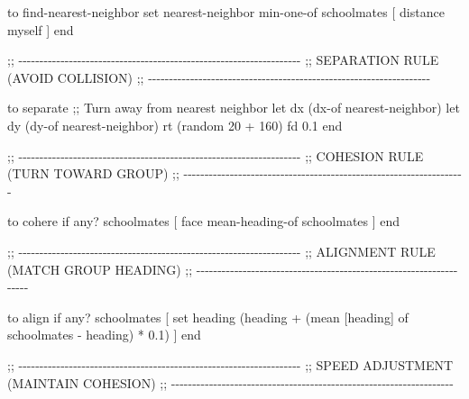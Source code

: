 \documentclass[
]{book}
\newenvironment{Shaded}{\begin{snugshade}}{\end{snugshade}}
\newcommand{\NormalTok}[1]{#1}
\begin{document}
\begin{Shaded}
\begin{Highlighting}[]
\NormalTok{to find{-}nearest{-}neighbor}
\NormalTok{  set nearest{-}neighbor min{-}one{-}of schoolmates [ distance myself ]}
\NormalTok{end}


\NormalTok{;; {-}{-}{-}{-}{-}{-}{-}{-}{-}{-}{-}{-}{-}{-}{-}{-}{-}{-}{-}{-}{-}{-}{-}{-}{-}{-}{-}{-}{-}{-}{-}{-}{-}{-}{-}{-}{-}{-}{-}{-}{-}{-}{-}{-}{-}{-}{-}{-}{-}{-}{-}{-}{-}{-}{-}{-}{-}{-}{-}{-}{-}{-}{-}{-}{-}{-}{-}}
\NormalTok{;;  SEPARATION RULE (AVOID COLLISION)}
\NormalTok{;; {-}{-}{-}{-}{-}{-}{-}{-}{-}{-}{-}{-}{-}{-}{-}{-}{-}{-}{-}{-}{-}{-}{-}{-}{-}{-}{-}{-}{-}{-}{-}{-}{-}{-}{-}{-}{-}{-}{-}{-}{-}{-}{-}{-}{-}{-}{-}{-}{-}{-}{-}{-}{-}{-}{-}{-}{-}{-}{-}{-}{-}{-}{-}{-}{-}{-}{-}}

\NormalTok{to separate}
\NormalTok{  ;; Turn away from nearest neighbor}
\NormalTok{  let dx (dx{-}of nearest{-}neighbor)}
\NormalTok{  let dy (dy{-}of nearest{-}neighbor)}
\NormalTok{  rt (random 20 + 160)}
\NormalTok{  fd 0.1}
\NormalTok{end}


\NormalTok{;; {-}{-}{-}{-}{-}{-}{-}{-}{-}{-}{-}{-}{-}{-}{-}{-}{-}{-}{-}{-}{-}{-}{-}{-}{-}{-}{-}{-}{-}{-}{-}{-}{-}{-}{-}{-}{-}{-}{-}{-}{-}{-}{-}{-}{-}{-}{-}{-}{-}{-}{-}{-}{-}{-}{-}{-}{-}{-}{-}{-}{-}{-}{-}{-}{-}{-}{-}}
\NormalTok{;;  COHESION RULE (TURN TOWARD GROUP)}
\NormalTok{;; {-}{-}{-}{-}{-}{-}{-}{-}{-}{-}{-}{-}{-}{-}{-}{-}{-}{-}{-}{-}{-}{-}{-}{-}{-}{-}{-}{-}{-}{-}{-}{-}{-}{-}{-}{-}{-}{-}{-}{-}{-}{-}{-}{-}{-}{-}{-}{-}{-}{-}{-}{-}{-}{-}{-}{-}{-}{-}{-}{-}{-}{-}{-}{-}{-}{-}{-}}

\NormalTok{to cohere}
\NormalTok{  if any? schoolmates [}
\NormalTok{    face mean{-}heading{-}of schoolmates}
\NormalTok{  ]}
\NormalTok{end}


\NormalTok{;; {-}{-}{-}{-}{-}{-}{-}{-}{-}{-}{-}{-}{-}{-}{-}{-}{-}{-}{-}{-}{-}{-}{-}{-}{-}{-}{-}{-}{-}{-}{-}{-}{-}{-}{-}{-}{-}{-}{-}{-}{-}{-}{-}{-}{-}{-}{-}{-}{-}{-}{-}{-}{-}{-}{-}{-}{-}{-}{-}{-}{-}{-}{-}{-}{-}{-}{-}}
\NormalTok{;;  ALIGNMENT RULE (MATCH GROUP HEADING)}
\NormalTok{;; {-}{-}{-}{-}{-}{-}{-}{-}{-}{-}{-}{-}{-}{-}{-}{-}{-}{-}{-}{-}{-}{-}{-}{-}{-}{-}{-}{-}{-}{-}{-}{-}{-}{-}{-}{-}{-}{-}{-}{-}{-}{-}{-}{-}{-}{-}{-}{-}{-}{-}{-}{-}{-}{-}{-}{-}{-}{-}{-}{-}{-}{-}{-}{-}{-}{-}{-}}

\NormalTok{to align}
\NormalTok{  if any? schoolmates [}
\NormalTok{    set heading (heading + (mean [heading] of schoolmates {-} heading) * 0.1)}
\NormalTok{  ]}
\NormalTok{end}


\NormalTok{;; {-}{-}{-}{-}{-}{-}{-}{-}{-}{-}{-}{-}{-}{-}{-}{-}{-}{-}{-}{-}{-}{-}{-}{-}{-}{-}{-}{-}{-}{-}{-}{-}{-}{-}{-}{-}{-}{-}{-}{-}{-}{-}{-}{-}{-}{-}{-}{-}{-}{-}{-}{-}{-}{-}{-}{-}{-}{-}{-}{-}{-}{-}{-}{-}{-}{-}{-}}
\NormalTok{;;  SPEED ADJUSTMENT (MAINTAIN COHESION)}
\NormalTok{;; {-}{-}{-}{-}{-}{-}{-}{-}{-}{-}{-}{-}{-}{-}{-}{-}{-}{-}{-}{-}{-}{-}{-}{-}{-}{-}{-}{-}{-}{-}{-}{-}{-}{-}{-}{-}{-}{-}{-}{-}{-}{-}{-}{-}{-}{-}{-}{-}{-}{-}{-}{-}{-}{-}{-}{-}{-}{-}{-}{-}{-}{-}{-}{-}{-}{-}{-}}


\end{Highlighting}
\end{Shaded}
\end{document}
